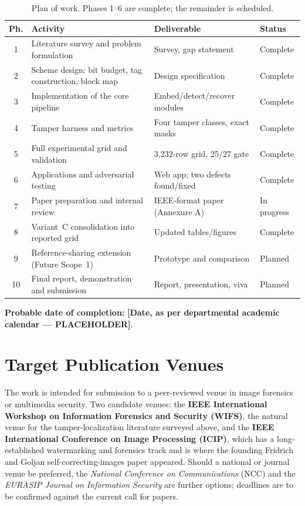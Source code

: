 \documentclass[12pt,a4paper]{article}
\newcommand{\PH}[1]{\textbf{[#1 --- PLACEHOLDER]}}
\begin{document}
\begin{table}[htbp]
\centering
\caption{Plan of work. Phases 1--6 are complete; the remainder is scheduled.}
\label{tab:plan}
\small
\begin{tabular}{@{}c p{1.75in} p{2.3in} p{0.85in}@{}}
\toprule
\textbf{Ph.} & \textbf{Activity} & \textbf{Deliverable} & \textbf{Status} \\
\midrule
1 & Literature survey and problem formulation & Survey, gap statement & Complete \\
2 & Scheme design: bit budget, tag construction, block map & Design specification & Complete \\
3 & Implementation of the core pipeline & Embed/detect/recover modules & Complete \\
4 & Tamper harness and metrics & Four tamper classes, exact masks & Complete \\
5 & Full experimental grid and validation & 3{,}232-row grid, 25/27 gate & Complete \\
6 & Applications and adversarial testing & Web app; two defects found/fixed & Complete \\
7 & Paper preparation and internal review & IEEE-format paper (Annexure A) & In progress \\
8 & Variant~C consolidation into reported grid & Updated tables/figures & Complete \\
9 & Reference-sharing extension (Future Scope~1) & Prototype and comparison & Planned \\
10 & Final report, demonstration and submission & Report, presentation, viva & Planned \\
\bottomrule
\end{tabular}
\end{table}

\noindent\textbf{Probable date of completion:} \PH{Date, as per departmental
academic calendar}.

\section{Target Publication Venues}

The work is intended for submission to a peer-reviewed venue in image
forensics or multimedia security. Two candidate venues: the \textbf{IEEE
International Workshop on Information Forensics and Security (WIFS)}, the
natural venue for the tamper-localization literature surveyed above, and the
\textbf{IEEE International Conference on Image Processing (ICIP)}, which has a
long-established watermarking and forensics track and is where the founding
Fridrich and Goljan self-correcting-images paper appeared. Should a national
or journal venue be preferred, the \emph{National Conference on
Communications} (NCC) and the \emph{EURASIP Journal on Information Security}
are further options; deadlines are to be confirmed against the current call
for papers.
\end{document}
